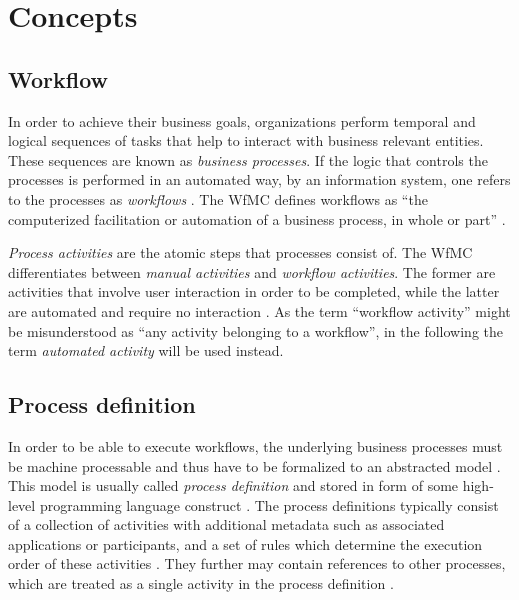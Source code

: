 
\section{Concepts} %
\label{sec:concepts}

  \subsection{Workflow} %
  \label{sub:workflow}
    In order to achieve their business goals, organizations perform temporal and logical sequences of tasks that help to interact with business relevant entities. These sequences are known as \emph{business processes}. If the logic that controls the processes is performed in an automated way, \eg by an information system, one refers to the processes as \emph{workflows} \cite{Becker1999Identifying,Hollingsworth1995Wfmc}. The \ac{WfMC} defines workflows as ``the computerized facilitation or automation of a business process, in whole or part'' \cite{Hollingsworth1995Wfmc}.

    \emph{Process activities} are the atomic steps that processes consist of. The \ac{WfMC} differentiates between \emph{manual activities} and \emph{workflow activities}. The former are activities that involve user interaction in order to be completed, while the latter are automated and require no interaction \cite{Hollingsworth1995Wfmc}. As the term ``workflow activity'' might be misunderstood as ``any activity belonging to a workflow'', in the following the term \emph{automated activity} will be used instead.


  \subsection{Process definition} %
  \label{sub:process_definition}
    In order to be able to execute workflows, the underlying business processes must be machine processable and thus have to be formalized to an abstracted model \cite{Hollingsworth1995Wfmc}. This model is usually called \emph{process definition} and stored in form of some high-level programming language construct \cite{Hollingsworth1995Wfmc,Wutke2008Model}.
    The process definitions typically consist of a collection of activities with additional metadata such as associated applications or participants, and a set of rules which determine the execution order of these activities \cite{Hollingsworth1995Wfmc}. They further may contain references to other processes, which are treated as a single activity in the process definition \cite{Hollingsworth1995Wfmc,Casati1999Specification}.

